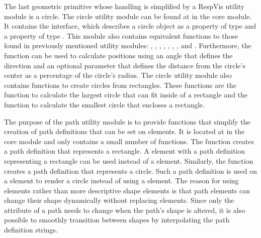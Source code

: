 
The last geometric primitive whose handling is simplified by a RespVis utility module is a circle.
The circle utility module can be found at  in the core module.
It contains the  interface, which describes a circle object as a  property of type  and a  property of type .
This module also contains equivalent functions to those found in previously mentioned utility modules: , , , , , , , and .
Furthermore, the  function can be used to calculate positions using an angle that defines the direction and an optional parameter that defines the distance from the circle's center as a percentage of the circle's radius.
The circle utility module also contains functions to create circles from rectangles.
These functions are the  function to calculate the largest circle that can fit inside of a rectangle and the  function to calculate the smallest circle that encloses a rectangle.


The purpose of the path utility module is to provide functions that simplify the creation of path definitions that can be set on  elements.
It is located at  in the core module and only contains a small number of functions.
The  function creates a path definition that represents a rectangle. 
A  element with a path definition representing a rectangle can be used instead of a  element. 
Similarly, the  function creates a path definition that represents a circle.
Such a path definition is used on a  element to render a circle instead of using a  element.
The reason for using  elements rather than more descriptive shape elements is that path elements can change their shape dynamically without replacing elements.
Since only the  attribute of a path needs to change when the path's shape is altered, it is also possible to smoothly transition between shapes by interpolating the path definition strings.

